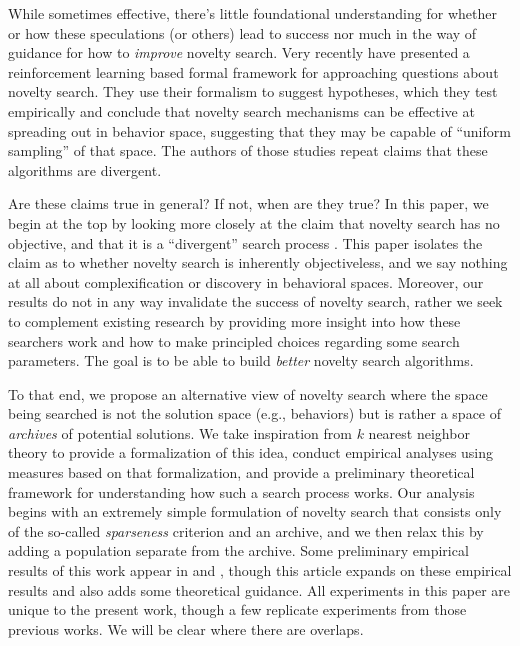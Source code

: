 \documentclass[twoside]{article}
\begin{document}
While sometimes effective, there's little foundational understanding for whether or how these speculations (or others) lead to success nor much in the way of guidance for how to \emph{improve} novelty search.  Very recently \citet{Doncieux2020gecco,Doncieux2019gecco} have presented a reinforcement learning based formal framework for approaching questions about novelty search.  They use their formalism to suggest hypotheses, which they test empirically and conclude that novelty search mechanisms can be effective at spreading out in behavior space, suggesting that they may be capable of ``uniform sampling'' of that space.  The authors of those studies repeat claims that these algorithms are divergent.

Are these claims true in general?  If not, when are they true?  In this paper, we begin at the top by looking more closely at the claim that novelty search has no objective, and that it is a ``divergent'' search process \citep{Lehman2016frai,Lehman2015gecco,StanleyLehman2015}.  This paper isolates the claim as to whether novelty search is inherently objectiveless, and we say nothing at all about complexification or discovery in behavioral spaces.  Moreover, our results do not in any way invalidate the success of novelty search, rather we seek to complement existing research by providing more insight into how these searchers work and how to make principled choices regarding some search parameters.  The goal is to be able to build \emph{better} novelty search algorithms.

To that end, we propose an alternative view of novelty search where the space being searched is not the solution space (e.g., behaviors) but is rather a space of \emph{archives} of potential solutions.  We take inspiration from $k$ nearest neighbor theory to provide a formalization of this idea, conduct empirical analyses using measures based on that formalization, and provide a preliminary theoretical framework for understanding how such a search process works.  Our analysis begins with an extremely simple formulation of novelty search that consists only of the so-called \emph{sparseness} criterion and an archive, and we then relax this by adding a population separate from the archive.  Some preliminary empirical results of this work appear in \citet{Wiegand2020flairs} and \citet{Wiegand2021flairs}, though this article expands on these empirical results and also adds some theoretical guidance.  All experiments in this paper are unique to the present work, though a few replicate experiments from those previous works.  We will be clear where there are overlaps.
\end{document}
